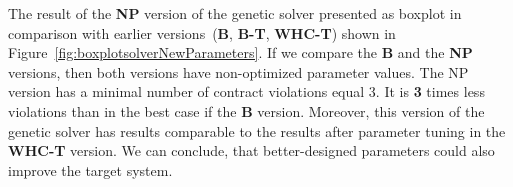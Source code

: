 \begin{table}
	\centering
	\caption{Parameters of NP and NP-T versions of the genetic solver}\label{tab:Parameters_NP-T}
\end{table}

The result of the \textbf{NP} version of the genetic solver presented as boxplot in comparison with earlier versions~(\textbf{B}, \textbf{B-T}, \textbf{WHC-T}) shown in Figure~\ref{fig:boxplotsolverNewParameters}. If we compare the \textbf{B} and the \textbf{NP} versions, then both versions have non-optimized parameter values. The NP version has a minimal number of contract violations equal 3. It is \textbf{3} times less violations than in the best case if the \textbf{B} version. Moreover, this version of the genetic solver has results comparable to the results after parameter tuning in the \textbf{WHC-T} version. We can conclude, that better-designed parameters could also improve the target system. 

